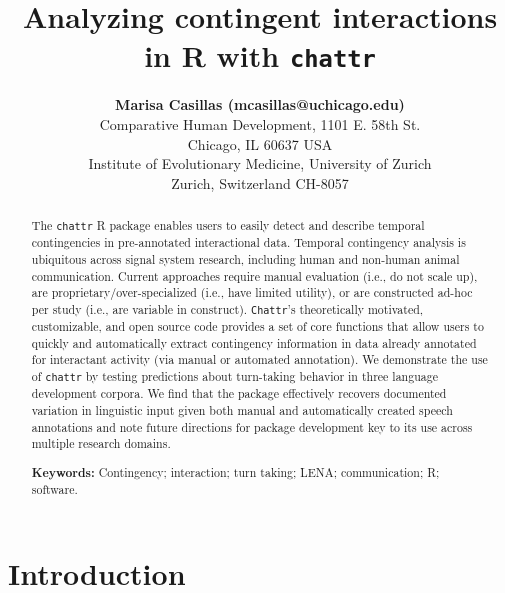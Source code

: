\documentclass[10pt, letterpaper]{article}
\title{Analyzing contingent interactions in R with \texttt{chattr}}
\author{{\large \bf Marisa Casillas (mcasillas@uchicago.edu)} \\ Comparative Human Development, 1101 E. 58th St. \\ Chicago, IL 60637 USA \AND {\large \bf Camila Scaff (camila.scaff@iem.uzh.ch)} \\ Institute of Evolutionary Medicine, University of Zurich \\ Zurich, Switzerland CH-8057}
\begin{document}
\maketitle

\begin{abstract}
The \texttt{chattr} R package enables users to easily detect and
describe temporal contingencies in pre-annotated interactional data.
Temporal contingency analysis is ubiquitous across signal system
research, including human and non-human animal communication. Current
approaches require manual evaluation (i.e., do not scale up), are
proprietary/over-specialized (i.e., have limited utility), or are
constructed ad-hoc per study (i.e., are variable in construct).
\texttt{Chattr}'s theoretically motivated, customizable, and open source
code provides a set of core functions that allow users to quickly and
automatically extract contingency information in data already annotated
for interactant activity (via manual or automated annotation). We
demonstrate the use of \texttt{chattr} by testing predictions about
turn-taking behavior in three language development corpora. We find that
the package effectively recovers documented variation in linguistic
input given both manual and automatically created speech annotations and
note future directions for package development key to its use across
multiple research domains.

\textbf{Keywords:}
Contingency; interaction; turn taking; LENA; communication; R; software.
\end{abstract}

\hypertarget{introduction}{%
\section{Introduction}\label{introduction}}
\end{document}
